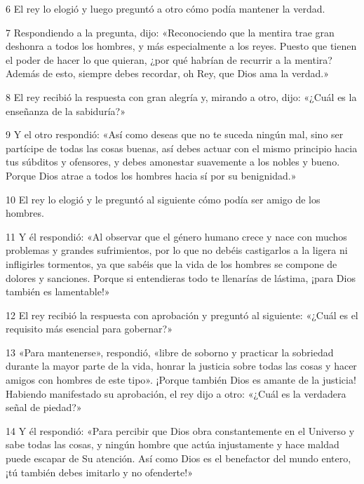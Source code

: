 \par 6 El rey lo elogió y luego preguntó a otro cómo podía mantener la verdad.

\par 7 Respondiendo a la pregunta, dijo: «Reconociendo que la mentira trae gran deshonra a todos los hombres, y más especialmente a los reyes. Puesto que tienen el poder de hacer lo que quieran, ¿por qué habrían de recurrir a la mentira? Además de esto, siempre debes recordar, oh Rey, que Dios ama la verdad.»

\par 8 El rey recibió la respuesta con gran alegría y, mirando a otro, dijo: «¿Cuál es la enseñanza de la sabiduría?»

\par 9 Y el otro respondió: «Así como deseas que no te suceda ningún mal, sino ser partícipe de todas las cosas buenas, así debes actuar con el mismo principio hacia tus súbditos y ofensores, y debes amonestar suavemente a los nobles y bueno. Porque Dios atrae a todos los hombres hacia sí por su benignidad.»

\par 10 El rey lo elogió y le preguntó al siguiente cómo podía ser amigo de los hombres.

\par 11 Y él respondió: «Al observar que el género humano crece y nace con muchos problemas y grandes sufrimientos, por lo que no debéis castigarlos a la ligera ni infligirles tormentos, ya que sabéis que la vida de los hombres se compone de dolores y sanciones. Porque si entendieras todo te llenarías de lástima, ¡para Dios también es lamentable!»

\par 12 El rey recibió la respuesta con aprobación y preguntó al siguiente: «¿Cuál es el requisito más esencial para gobernar?»

\par 13 «Para mantenerse», respondió, «libre de soborno y practicar la sobriedad durante la mayor parte de la vida, honrar la justicia sobre todas las cosas y hacer amigos con hombres de este tipo». ¡Porque también Dios es amante de la justicia! Habiendo manifestado su aprobación, el rey dijo a otro: «¿Cuál es la verdadera señal de piedad?»

\par 14 Y él respondió: «Para percibir que Dios obra constantemente en el Universo y sabe todas las cosas, y ningún hombre que actúa injustamente y hace maldad puede escapar de Su atención. Así como Dios es el benefactor del mundo entero, ¡tú también debes imitarlo y no ofenderte!»

